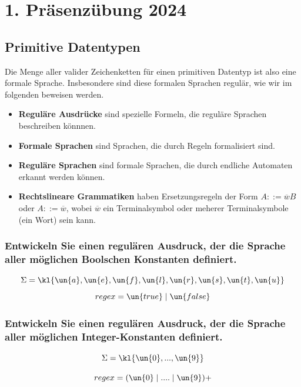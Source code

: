 
\section{1. Präsenzübung 2024}
\subsection{Primitive Datentypen}
Die Menge aller valider Zeichenketten für einen primitiven Datentyp ist also eine formale Sprache. Insbesondere sind diese formalen Sprachen regulär, wie wir im folgenden beweisen werden.
\begin{itemize}
\item \textbf{Reguläre Ausdrücke} sind spezielle Formeln, die reguläre Sprachen beschreiben könnnen. \\ \newline
\item \textbf{Formale Sprachen} sind Sprachen, die durch Regeln formalisiert sind. \\ \newline
\item \textbf{Reguläre Sprachen} sind formale Sprachen, die durch endliche Automaten erkannt werden können.  \\ \newline
\item \textbf{Rechtslineare Grammatiken} haben Ersetzungsregeln der Form $A ::= \overline{w}B$ oder $A ::= \overline{w}$, wobei $\overline{w}$ ein Terminalsymbol oder meherer Terminalsymbole (ein Wort) sein kann.
\end{itemize}

\subsubsection*{Entwickeln Sie einen regulären Ausdruck, der die Sprache aller möglichen Boolschen Konstanten definiert.}

\[
 \Sigma = \kl{\un{a},\un{e}, \un{f}, \un{l}, \un{r}, \un{s},\un{t},\un{u}}
\]
\[
regex = \un{true} \mid \un{false}
\]

\subsubsection*{Entwickeln Sie einen regulären Ausdruck, der die Sprache aller möglichen Integer-Konstanten definiert.}

\[
\Sigma = \kl{\un{0}, ..., \un{9}}
\]

\[
regex = (\un{0} \mid .... \mid \un{9})+
\]

